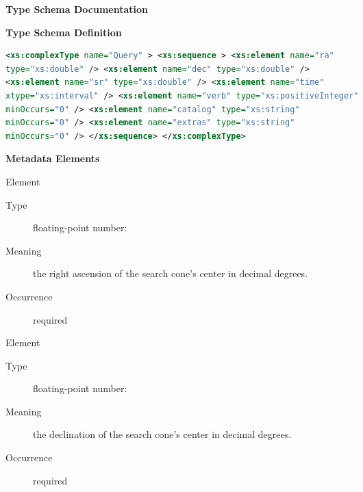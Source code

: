 \documentclass[11pt,a4paper]{ivoa} 
\begin{document}
\begin{generated} \begingroup \renewcommand*{}\vspace{2ex}\noindent\textbf{
Type Schema Documentation}


\vspace{1ex}\noindent\textbf{ Type Schema Definition}


\begin{lstlisting}[language=XML,basicstyle=\footnotesize]
<xs:complexType name="Query" > <xs:sequence > <xs:element name="ra"
type="xs:double" /> <xs:element name="dec" type="xs:double" />
<xs:element name="sr" type="xs:double" /> <xs:element name="time"
xtype="xs:interval" /> <xs:element name="verb" type="xs:positiveInteger"
minOccurs="0" /> <xs:element name="catalog" type="xs:string"
minOccurs="0" /> <xs:element name="extras" type="xs:string"
minOccurs="0" /> </xs:sequence> </xs:complexType> \end{lstlisting}

\vspace{0.5ex}\noindent\textbf{ Metadata Elements}

\begingroup\small\begin{bigdescription}\item[Element \xmlel{ra}]
\begin{description} \item[Type] floating-point number: 
\item[Meaning] the right ascension of the search cone's center in
decimal degrees.  
               
\item[Occurrence] required

\end{description} \item[Element \xmlel{dec}] \begin{description}
\item[Type] floating-point number:  \item[Meaning] the
declination of the search cone's center in decimal degrees.  
               
\item[Occurrence] required


\end{description}
\end{bigdescription}
\end{generated}
\end{document}
